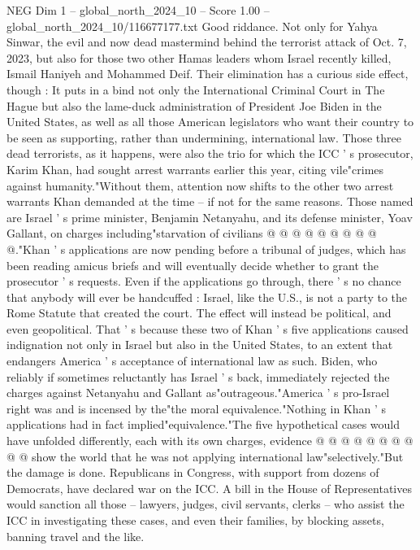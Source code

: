 \begin{textsample}{NEG Dim 1 – global\_north\_2024\_10 – Score 1.00 – global\_north\_2024\_10/116677177.txt}  \label{ex:f1_neg_075}
Good riddance.
Not only for Yahya Sinwar, the evil and now dead mastermind behind the terrorist attack of Oct. 7, 2023, but also for those two other Hamas leaders whom Israel recently killed, Ismail Haniyeh and Mohammed Deif.
Their elimination has a curious side effect, though : It puts in a bind not only the International Criminal Court in The Hague but also the lame-duck administration of President Joe Biden in the United States, as well as all those American legislators who want their country to be seen as supporting, rather than undermining, international law.
Those three dead terrorists, as it happens, were also the trio for which the ICC ' s prosecutor, Karim Khan, had sought arrest warrants earlier this year, citing vile"crimes against humanity."Without them, attention now shifts to the other two arrest warrants Khan demanded at the time -- if not for the same reasons.
Those named are Israel ' s prime minister, Benjamin Netanyahu, and its defense minister, Yoav Gallant, on charges including"starvation of civilians @ @ @ @ @ @ @ @ @ @."Khan ' s applications are now pending before a tribunal of judges, which has been reading amicus briefs and will eventually decide whether to grant the prosecutor ' s requests.
Even if the applications go through, there ' s no chance that anybody will ever be handcuffed : Israel, like the U.S., is not a party to the Rome Statute that created the court.
The effect will instead be political, and even geopolitical.
That ' s because these two of Khan ' s five applications caused indignation not only in Israel but also in the United States, to an extent that endangers America ' s acceptance of international law as such.
Biden, who reliably if sometimes reluctantly has Israel ' s back, immediately rejected the charges against Netanyahu and Gallant as"outrageous."America ' s pro-Israel right was and is incensed by the"the moral equivalence."Nothing in Khan ' s applications had in fact implied"equivalence."The five hypothetical cases would have unfolded differently, each with its own charges, evidence @ @ @ @ @ @ @ @ @ @ show the world that he was not applying international law"selectively."But the damage is done.
Republicans in Congress, with support from dozens of Democrats, have declared war on the ICC.
A bill in the House of Representatives would sanction all those -- lawyers, judges, civil servants, clerks -- who assist the ICC in investigating these cases, and even their families, by blocking assets, banning travel and the like.

\end{textsample}
